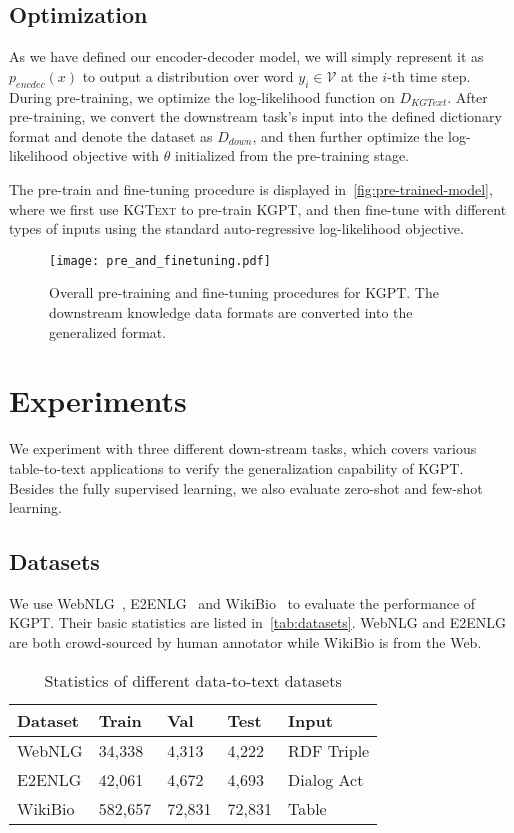 \documentclass[11pt,a4paper]{article}
\newcommand{\dataset}{\textsc{KGText}\xspace}
\newcommand{\model}{KGPT\xspace}
\begin{document}
\subsection{Optimization}
As we have defined our encoder-decoder model, we will simply represent it as $p_{encdec}(x)$ to output a distribution over word $y_i \in \mathcal{V}$ at the $i$-th time step. During pre-training, we optimize the log-likelihood function on $D_{KGText}$. After pre-training, we convert the downstream task's input into the defined dictionary format and denote the dataset as $D_{down}$, and then further optimize the log-likelihood objective with $\theta$ initialized from the pre-training stage. 

The pre-train and fine-tuning procedure is displayed in~\autoref{fig:pre-trained-model}, where we first use \dataset to pre-train \model, and then fine-tune with different types of inputs using the standard auto-regressive log-likelihood objective. 
\begin{figure}[!thb]
    \centering
    \texttt{[image: pre\_and\_finetuning.pdf]}
    \caption{Overall pre-training and fine-tuning procedures for \model. The downstream knowledge data formats are converted into the generalized format. }
    \label{fig:pre-trained-model}
\end{figure}



\section{Experiments}
We experiment with three different down-stream tasks, which covers various table-to-text applications to verify the generalization  capability of \model. Besides the fully supervised learning, we also evaluate zero-shot and few-shot learning.

\subsection{Datasets}
We use WebNLG~\cite{shimorina2018handling}, E2ENLG~\cite{dusek2019e2e} and WikiBio~\cite{lebret2016neural} to evaluate the performance of \model. Their basic statistics are listed in~\autoref{tab:datasets}. WebNLG and E2ENLG are both crowd-sourced by human annotator while WikiBio is from the Web.
\begin{table}[!thb]
\small
\begin{tabular}{lllll}
\hline
Dataset & Train & Val & Test & Input \\
\hline
WebNLG  & 34,338 & 4,313 & 4,222 & RDF Triple \\
E2ENLG & 42,061  & 4,672 & 4,693 & Dialog Act \\
WikiBio & 582,657 & 72,831 & 72,831 & Table \\
\hline
\end{tabular}
\caption{Statistics of different data-to-text datasets}
\label{tab:datasets}
\vspace{-2ex}
\end{table}
\end{document}
